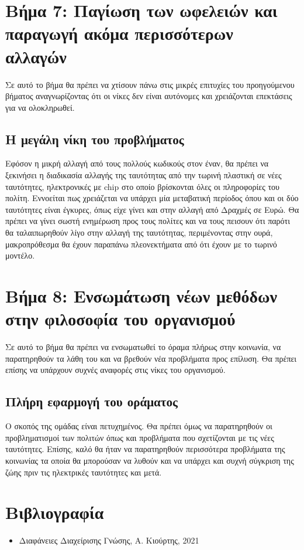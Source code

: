 \documentclass{fphw}
\begin{document}
    \section*{Βήμα 7: Παγίωση των ωφελειών και παραγωγή ακόμα περισσότερων αλλαγών}

    \begin{problem}
        Σε αυτό το βήμα θα πρέπει να χτίσουν πάνω στις μικρές επιτυχίες του προηγούμενου βήματος
        αναγνωρίζοντας ότι οι νίκες δεν είναι αυτόνομες και χρειάζονται επεκτάσεις για να ολοκληρωθεί.
    \end{problem}

    \subsection*{Η μεγάλη νίκη του προβλήματος}
    Εφόσον η μικρή αλλαγή από τους πολλούς κωδικούς στον έναν, θα πρέπει να ξεκινήσει η διαδικασία αλλαγής
    της ταυτότητας από την τωρινή πλαστική σε νέες ταυτότητες, ηλεκτρονικές με chip στο οποίο βρίσκονται όλες οι πληροφορίες
    του πολίτη. Εννοείται πως χρειάζεται να υπάρχει μία μεταβατική περίοδος όπου και οι δύο ταυτότητες είναι έγκυρες, όπως 
    είχε γίνει και στην αλλαγή από Δραχμές σε Ευρώ. Θα πρέπει να γίνει σωστή ενημέρωση προς τους πολίτες και να τους πεισουν 
    ότι παρότι θα ταλαιπωρηθούν λίγο στην αλλαγή της ταυτότητας, περιμένοντας στην ουρά, μακροπρόθεσμα θα έχουν παραπάνω πλεονεκτήματα 
    από ότι έχουν με το τωρινό μοντέλο.

    \section*{Βήμα 8: Ενσωμάτωση νέων μεθόδων στην φιλοσοφία του οργανισμού}

    \begin{problem}
        Σε αυτό το βήμα θα πρέπει να ενσωματωθεί το όραμα πλήρως στην κοινωνία,
        να παρατηρηθούν τα λάθη του και να βρεθούν νέα προβλήματα προς επίλυση. Θα πρέπει
        επίσης να υπάρχουν συχνές αναφορές στις νίκες του οργανισμού.
    \end{problem}

    \subsection*{Πλήρη εφαρμογή του οράματος}
    Ο σκοπός της ομάδας είναι πετυχημένος. Θα πρέπει όμως να παρατηρηθούν οι προβληματισμοί των πολιτών
    όπως και προβλήματα που σχετίζονται με τις νέες ταυτότητες. Επίσης, καλό θα ήταν να παρατηρηθούν περισσότερα προβλήματα της κοινωνίας
    τα οποία θα μπορούσαν να λυθούν και να υπάρχει και συχνή σύγκριση της ζώης πριν τις ηλεκτρικές ταυτότητες και μετά.

    \section*{Βιβλιογραφία}
    \begin{itemize}
        \item Διαφάνειες Διαχείρισης Γνώσης, Α. Κιούρτης, 2021
    \end{itemize}
\end{document}
